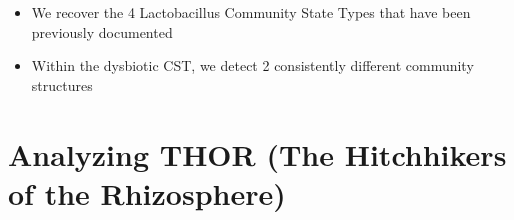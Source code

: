 \documentclass{beamer}
\begin{document}
\begin{frame}
  \begin{itemize}
  \item We recover the 4 Lactobacillus Community State Types that have been
  previously documented
  \item Within the dysbiotic CST, we detect 2 consistently different community
  structures
  \end{itemize}
\begin{figure}
\end{figure}
\end{frame}

\section{Analyzing THOR (The Hitchhikers of the Rhizosphere)}
\end{document}
